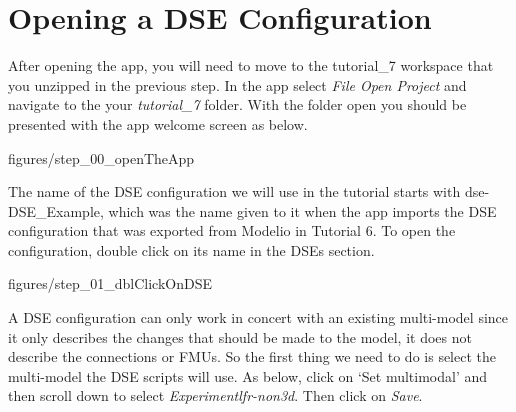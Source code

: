 \documentclass[11pt,a4paper]{../tutorial}
\begin{document}
\newpage


\section{Opening a DSE Configuration}

\begin{instructions}

\item After opening the app, you will need to move to the tutorial\_7 workspace that you unzipped in the previous step.  In the app select \emph{File \menusep Open Project} and navigate to the your \emph{tutorial\_7} folder.  With the folder open you should be presented with the app welcome screen as below.

\begin{center}\begin{annotation}[width=0.7\linewidth,trim=0 0 0 0,clip]{figures/step_00_openTheApp}
\end{annotation}\end{center}

\item The name of the DSE configuration we will use in the tutorial starts with dse-DSE\_Example, which was the name given to it when the app imports the DSE configuration that was exported from Modelio in Tutorial 6.  
To open the configuration, double click on its name in the DSEs section.


\begin{center}\begin{annotation}[width=0.7\linewidth,trim=0 0 0 0,clip]{figures/step_01_dblClickOnDSE}
\end{annotation}\end{center}

\item A DSE configuration can only work in concert with an existing multi-model since it only describes the changes that should be made to the model, it does not describe the connections or FMUs.  So the first thing we need to do is select the multi-model the DSE scripts will use.  As below, click on ‘Set multimodal’ and then scroll down to select \emph{Experiment\pathsep{}lfr-non3d}.  Then click on \emph{Save}.



\end{instructions}
\end{document}
